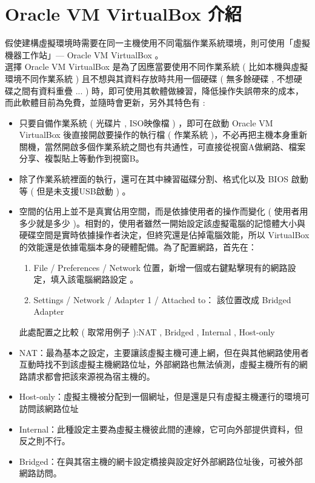 \documentclass[14pt,a4paper]{report}  %
\begin{document}
\section{Oracle VM VirtualBox 介紹}
 假使建構虛擬環境時需要在同一主機使用不同電腦作業系統環境，則可使用「虛擬機器工作站」— Oracle VM VirtualBox 。\\
 選擇 Oracle VM VirtualBox    是為了因應當要使用不同作業系統 ( 比如本機與虛擬環境不同作業系統  ) 且不想與其資料存放時共用一個硬碟 ( 無多餘硬碟 , 不想硬碟之間有資料重疊 ... ) 時，即可使用其軟體做練習，降低操作失誤帶來的成本，而此軟體目前為免費，並隨時會更新，另外其特色有 :\\  
\begin{itemize}
\item 只要自備作業系統 ( 光碟片 , ISO映像檔 ) ，即可在啟動 Oracle VM VirtualBox  後直接開啟要操作的執行檔 ( 作業系統 )，不必再把主機本身重新關機，當然開啟多個作業系統之間也有共通性，可直接從視窗A做網路、檔案分享、複製貼上等動作到視窗B。\\
\item 除了作業系統裡面的執行，還可在其中練習磁碟分割、格式化以及 BIOS 啟動等 ( 但是未支援USB啟動 ) 。\\
\item 空間的佔用上並不是真實佔用空間，而是依據使用者的操作而變化 ( 使用者用多少就是多少 )。相對的，使用者雖然一開始設定該虛擬電腦的記憶體大小與硬碟空間是實時依據操作者決定，但終究還是佔掉電腦效能，所以 VirtualBox 的效能還是依據電腦本身的硬體配備。為了配置網路，首先在：
\begin{enumerate}
\item File / Preferences / Network  位置，新增一個或右鍵點擊現有的網路設定，填入該電腦網路設定 。
\item Settings / Network / Adapter 1 / Attached to： 該位置改成  Bridged Adapter
\end{enumerate}
\qquad 此處配置之比較 ( 取常用例子 ):NAT , Bridged , Internal , Host-only
\item NAT：最為基本之設定，主要讓該虛擬主機可連上網，但在與其他網路使用者互動時找不到該虛擬主機網路位址，外部網路也無法偵測，虛擬主機所有的網路請求都會把該來源視為宿主機的。
\item Host-only：虛擬主機被分配到一個網址，但是還是只有虛擬主機運行的環境可訪問該網路位址
\item Internal：此種設定主要為虛擬主機彼此間的連線，它可向外部提供資料，但反之則不行。
\item Bridged：在與其宿主機的網卡設定橋接與設定好外部網路位址後，可被外部網路訪問。
\end{itemize}
\newpage
\end{document}
